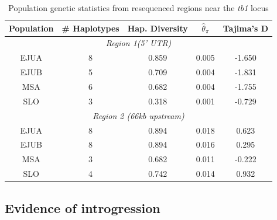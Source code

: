 \documentclass[11pt]{article}
\begin{document}
\begin{linenumbers}
\begin{flushleft}
\begin{table}[htbp]
  \centering
  \caption{Population genetic statistics from resequenced regions near the \emph{tb1} locus}
    \begin{tabular}{ccccc}\\\toprule
    \textbf{Population} & \# \textbf{Haplotypes} & \textbf{Hap. Diversity} & \textbf{$\hat\theta_\pi$}    & \textbf{Tajima's D} \\\midrule
    \multicolumn{5}{c}{\textit{Region 1(5' UTR)}} \\
    \multicolumn{1}{c}{EJUA} & 8     & 0.859 & 0.005 & -1.650 \\
    \multicolumn{1}{c}{EJUB} & 5     & 0.709 & 0.004 & -1.831 \\
    \multicolumn{1}{c}{MSA} & 6     & 0.682 & 0.004 & -1.755 \\
    \multicolumn{1}{c}{SLO} & 3     & 0.318 & 0.001 & -0.729 \\
    \multicolumn{5}{c}{\textit{Region 2 (66kb upstream)}} \\
    \multicolumn{1}{c}{EJUA} & 8     & 0.894 & 0.018 & 0.623 \\
    \multicolumn{1}{c}{EJUB} & 8     & 0.894 & 0.016 & 0.295 \\
    \multicolumn{1}{c}{MSA} & 3     & 0.682 & 0.011 & -0.222 \\
    \multicolumn{1}{c}{SLO} & 4     & 0.742 & 0.014 & 0.932 \\\bottomrule
    \end{tabular}
  \label{Table2Diversity}
\end{table}

\subsection*{Evidence of introgression} %


\end{flushleft}
\end{linenumbers}
\end{document}
